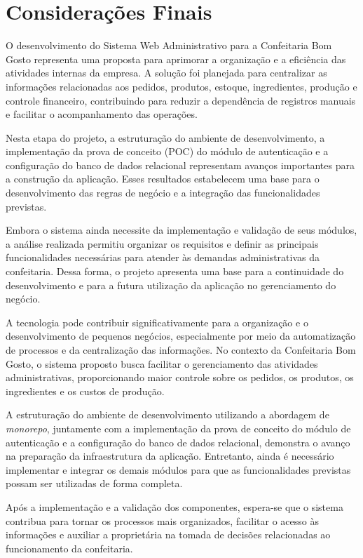 \chapter{Considerações Finais}

O desenvolvimento do Sistema Web Administrativo para a Confeitaria Bom Gosto representa uma proposta para aprimorar a organização e a eficiência das atividades internas da empresa. A solução foi planejada para centralizar as informações relacionadas aos pedidos, produtos, estoque, ingredientes, produção e controle financeiro, contribuindo para reduzir a dependência de registros manuais e facilitar o acompanhamento das operações.

Nesta etapa do projeto, a estruturação do ambiente de desenvolvimento, a implementação da prova de conceito (POC) do módulo de autenticação e a configuração do banco de dados relacional representam avanços importantes para a construção da aplicação. Esses resultados estabelecem uma base para o desenvolvimento das regras de negócio e a integração das funcionalidades previstas.

Embora o sistema ainda necessite da implementação e validação de seus módulos, a análise realizada permitiu organizar os requisitos e definir as principais funcionalidades necessárias para atender às demandas administrativas da confeitaria. Dessa forma, o projeto apresenta uma base para a continuidade do desenvolvimento e para a futura utilização da aplicação no gerenciamento do negócio.

A tecnologia pode contribuir significativamente para a organização e o desenvolvimento de pequenos negócios, especialmente por meio da automatização de processos e da centralização das informações. No contexto da Confeitaria Bom Gosto, o sistema proposto busca facilitar o gerenciamento das atividades administrativas, proporcionando maior controle sobre os pedidos, os produtos, os ingredientes e os custos de produção.

A estruturação do ambiente de desenvolvimento utilizando a abordagem de \textit{monorepo}, juntamente com a implementação da prova de conceito do módulo de autenticação e a configuração do banco de dados relacional, demonstra o avanço na preparação da infraestrutura da aplicação. Entretanto, ainda é necessário implementar e integrar os demais módulos para que as funcionalidades previstas possam ser utilizadas de forma completa.

Após a implementação e a validação dos componentes, espera-se que o sistema contribua para tornar os processos mais organizados, facilitar o acesso às informações e auxiliar a proprietária na tomada de decisões relacionadas ao funcionamento da confeitaria.


